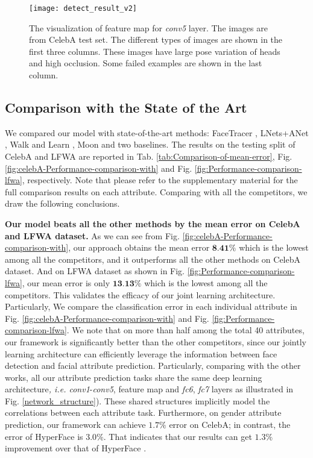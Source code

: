 \documentclass[10pt,twocolumn,letterpaper]{article}
\begin{document}
\begin{figure*}[tp]
\begin{centering}
\texttt{[image: detect\_result\_v2]} %
\par\end{centering}
\caption{\label{Detection_result_of_joint} The visualization of feature map
for \emph{conv5} layer. The images are from CelebA test set. The different
types of images are shown in the first three columns. These images
have large pose variation of heads and high occlusion. Some failed
examples are shown in the last column.}
\end{figure*}

\subsection{Comparison with the State of the Art}
We compared our model with state-of-the-art methods: FaceTracer \cite{kumar2008facetracer},
LNets+ANet \cite{liu2015deep}, Walk and Learn \cite{wang2016walk},
Moon \cite{rudd2016moon} and two baselines. The results on the testing
split of CelebA and LFWA are reported in Tab. \ref{tab:Comparison-of-mean-error}, Fig. \ref{fig:celebA-Performance-comparison-with}
and Fig. \ref{fig:Performance-comparison-lfwa}, respectively. 
Note that please refer to the supplementary material for the full comparison results on each attribute. Comparing
with all the competitors, we draw the following conclusions.

\vspace{0.05in}

\noindent \textbf{Our model beats all the other methods by the mean error
on CelebA and LFWA dataset. }As we can see from Fig. \ref{fig:celebA-Performance-comparison-with},
our approach obtains the mean error $\textbf{8.41\%}$ which is the
lowest among all the competitors, and it outperforms all the other
methods on CelebA dataset. And on LFWA dataset as shown in Fig. \ref{fig:Performance-comparison-lfwa},
our mean error is only $\textbf{13.13\%}$ which is the lowest among
all the competitors. This validates the efficacy of our joint learning
architecture. Particularly, We compare the classification error
in each individual attribute in Fig. \ref{fig:celebA-Performance-comparison-with}
and Fig. \ref{fig:Performance-comparison-lfwa}. We note that on more
than half among the total 40 attributes, our framework is significantly
better than the other competitors, since our jointly learning architecture
can efficiently leverage the information between face detection and
facial attribute prediction. Particularly, comparing with the other
works, all our attribute prediction tasks share the same deep learning
architecture\emph{, i.e. conv1}-\emph{conv5}, feature map and \emph{fc6},
\emph{fc7} layers as illustrated in Fig. \ref{network_structure}).
These shared structures implicitly model the correlations between
each attribute task. Furthermore, on gender attribute
prediction, our framework can achieve $1.7\%$ error on CelebA; in contrast,
the error of HyperFace \cite{ranjan2016hyperface} is $3.0\%$.
That indicates that our results can get $1.3\%$ improvement over
that of HyperFace \cite{ranjan2016hyperface}.
\end{document}

